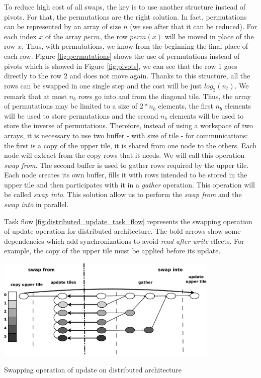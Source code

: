 To reduce high cost of all swaps, the key is to use another structure instead of pivots. For that, the permutations are the right solution. In fact, permutations can be represented by an array of size $n$ (we see after that it can be reduced). For each index $x$ of the array $perm$, the row $perm(x)$ will be moved in place of the row $x$. Thus, with permutations, we know from the beginning the final place of each row. 
Figure \ref{fig:permutations} shows the use of permutations instead of pivots which is showed in Figure \ref{fig:pivots}, we can see that the row 1 goes directly to the row 2 and does	 not move again.
Thanks to this structure, all the rows can be swapped in one single step and the cost will be just $log_2(n_t)$. 
We remark that at most $n_b$ rows go into and from the diagonal tile. Thus, the array of permutations may be limited to a size of $2*n_b$ elements, the first $n_b$ elements will be used to store permutations and the second $n_b$ elements will be used to store the inverse of permutations. Therefore, instead of using a workspace of two arrays, it is necessary to use two buffer - with size of tile - for communications: the first is a copy of the upper tile, it is shared from one node to the others. Each node will extract from the copy rows that it needs. We will call this operation \emph{swap from}. The second buffer is used to gather rows required by the upper tile. Each node creates its own buffer, fills it with rows intended to be stored in the upper tile and then participates with it in a \textit{gather} operation. This operation will be called \emph{swap into}. This solution allow us to perform the \emph{swap from} and the \emph{swap into} in parallel.

Task flow \ref{fig:distributed_update_task_flow} represents the swapping operation of update operation for distributed architecture. The bold arrows show some dependencies which add synchronizations to avoid \emph{read after write} effects. For example, the copy of the upper tile must be applied before its update.

\begin{taskflow}[!ht]
\centering
\includegraphics[width=0.8\textwidth]{figures/distributed_update_tf_bw.pdf}
\caption{Swapping operation of update on distributed architecture \label{fig:distributed_update_task_flow}}
\end{taskflow}

